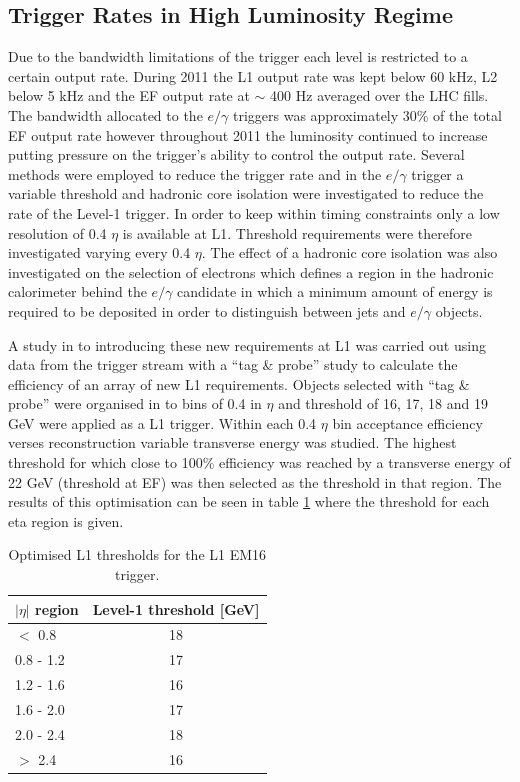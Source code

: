 
	\subsection{Trigger Rates in High Luminosity Regime}
		\label{sec:TrigRates}

		Due to the bandwidth limitations of the trigger each level is restricted to a certain output rate. During 2011 the L1 output rate was kept below 60 kHz, L2 below 5 kHz and the EF output rate at $\sim$ 400 Hz averaged over the LHC fills. The bandwidth allocated to the $e/\gamma$ triggers was approximately 30\% of the total EF output rate however throughout 2011 the luminosity continued to increase putting pressure on the trigger's ability to control the output rate. Several methods were employed to reduce the trigger rate and in the $e/\gamma$ trigger a variable threshold and hadronic core isolation were investigated to reduce the rate of the Level-1 trigger. In order to keep within timing constraints only a low resolution of 0.4 $\eta$ is available at L1. Threshold requirements were therefore investigated varying every 0.4 $\eta$. The effect of a hadronic core isolation was also investigated on the selection of electrons which defines a region in the hadronic calorimeter behind the $e/\gamma$ candidate in which a minimum amount of energy is required to be deposited in order to distinguish between jets and $e/\gamma$ objects. 


		A study in to introducing these new requirements \cite{ATLAS-CONF-2012-048} at L1 was carried out using data from the trigger stream with a ``tag \& probe'' study to calculate the efficiency of an array of new L1 requirements. Objects selected with ``tag \& probe'' were organised in to bins of 0.4 in $\eta$ and threshold of 16, 17, 18 and 19 GeV were applied as a L1 trigger. Within each 0.4 $\eta$ bin acceptance efficiency verses reconstruction variable transverse energy was studied. The highest threshold for which close to 100\% efficiency was reached by a transverse energy of 22 GeV (threshold at EF) was then selected as the threshold in that region. The results of this optimisation can be seen in table \ref{tab:L1_thresh} where the threshold for each eta region is given. 

		\begin {table}[h!]
		\begin{center}
	  	\begin{tabular}{  l | c  }%
			\hline
			$|\eta|$ region & Level-1 threshold [GeV] \\
			\hline
			$<$ 0.8 	& 18 \\
			0.8 - 1.2 	& 17 \\
			1.2 - 1.6 	& 16 \\
			1.6 - 2.0 	& 17 \\
			2.0 - 2.4 	& 18 \\
			$>$ 2.4 	& 16 \\
	    	\hline
	  	\end{tabular}
	  	\caption{Optimised L1 thresholds for the L1 EM16 trigger.}
	  	\label{tab:L1_thresh}
	  	\end{center}
		\end {table}


